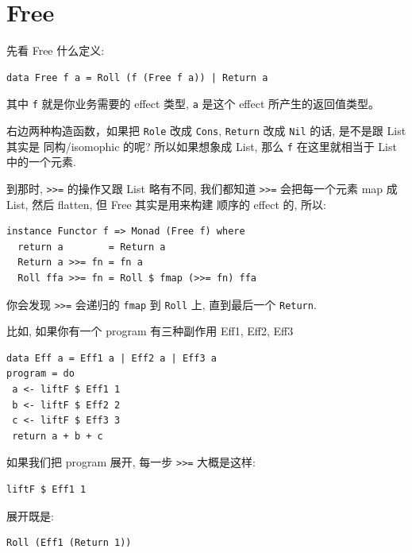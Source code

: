 \documentclass[letterspacing]{tufte-book}
\begin{document}
\section{Free}
\label{sec:orged5e29d}
先看 Free 什么定义:

\lstset{language=haskell,label= ,caption= ,captionpos=b,numbers=none}
\begin{lstlisting}
data Free f a = Roll (f (Free f a)) | Return a
\end{lstlisting}

其中 \texttt{f} 就是你业务需要的 effect 类型, \texttt{a} 是这个 effect 所产生的返回值类型。

右边两种构造函数，如果把 \texttt{Role} 改成 \texttt{Cons}, \texttt{Return} 改成 \texttt{Nil} 的话, 是不是跟 List 其实是 同构/isomophic 的呢? 所以如果想象成 List, 那么 \texttt{f} 在这里就相当于 List 中的一个元素.

到那时, \texttt{>>=} 的操作又跟 List 略有不同, 我们都知道 \texttt{>>=} 会把每一个元素 map 成 List, 然后 flatten, 但 Free 其实是用来构建
顺序的 effect 的, 所以:

\lstset{language=haskell,label= ,caption= ,captionpos=b,numbers=none}
\begin{lstlisting}
instance Functor f => Monad (Free f) where
  return a        = Return a
  Return a >>= fn = fn a
  Roll ffa >>= fn = Roll $ fmap (>>= fn) ffa
\end{lstlisting}

你会发现 \texttt{>>=} 会递归的 \texttt{fmap} 到 \texttt{Roll} 上, 直到最后一个 \texttt{Return}.

比如, 如果你有一个 program 有三种副作用 Eff1, Eff2, Eff3

\lstset{language=haskell,label= ,caption= ,captionpos=b,numbers=none}
\begin{lstlisting}
data Eff a = Eff1 a | Eff2 a | Eff3 a
program = do
 a <- liftF $ Eff1 1
 b <- liftF $ Eff2 2
 c <- liftF $ Eff3 3
 return a + b + c
\end{lstlisting}

如果我们把 program 展开, 每一步 \texttt{>>=} 大概是这样:

\lstset{language=haskell,label= ,caption= ,captionpos=b,numbers=none}
\begin{lstlisting}
liftF $ Eff1 1
\end{lstlisting}

展开既是:

\lstset{language=haskell,label= ,caption= ,captionpos=b,numbers=none}
\begin{lstlisting}
Roll (Eff1 (Return 1))
\end{lstlisting}
\end{document}
